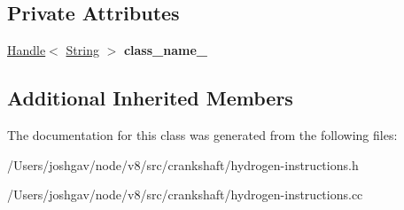 \subsection*{Private Attributes}
\begin{DoxyCompactItemize}
\item 
\hyperlink{classv8_1_1internal_1_1_handle}{Handle}$<$ \hyperlink{classv8_1_1internal_1_1_string}{String} $>$ {\bfseries class\+\_\+name\+\_\+}\hypertarget{classv8_1_1internal_1_1_h_class_of_test_and_branch_ab4aa959bf3db425428dbec2e93754fbb}{}\label{classv8_1_1internal_1_1_h_class_of_test_and_branch_ab4aa959bf3db425428dbec2e93754fbb}

\end{DoxyCompactItemize}
\subsection*{Additional Inherited Members}


The documentation for this class was generated from the following files\+:\begin{DoxyCompactItemize}
\item 
/\+Users/joshgav/node/v8/src/crankshaft/hydrogen-\/instructions.\+h\item 
/\+Users/joshgav/node/v8/src/crankshaft/hydrogen-\/instructions.\+cc\end{DoxyCompactItemize}
